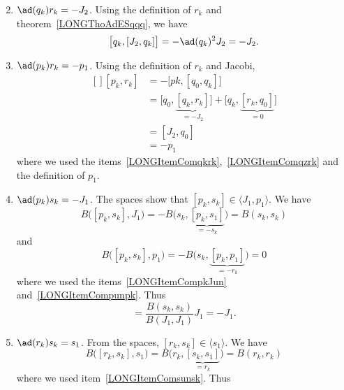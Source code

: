\begin{enumerate}
\begin{equation}
	      \end{equation}
	\item$\ad(q_k)r_k=-J_2$\label{LONGItemComqkrk}. Using the definition of $r_k$ and theorem~\ref{LONGThoAdESqqq}, we have
	      \begin{equation}
		      \big[ q_k,[J_2,q_k] \big]=-\ad(q_k)^2J_2=-J_2.
	      \end{equation}
	\item$\ad(p_k)r_k=-p_1$. Using the definition of $r_k$ and Jacobi,
	      \begin{equation}
		      \begin{aligned}[]
			      [p_k,r_k] & =-\big[ pk,[q_0,q_k] \big]                                                                  \\
			                & =\big[ q_0,\underbrace{[q_k,r_k]}_{=-J_2} \big]+\big[ q_k,\underbrace{[r_k,q_0]}_{=0} \big] \\
			                & =[J_2,q_0]                                                                                  \\
			                & =-p_1
		      \end{aligned}
	      \end{equation}
	      where we used the items~\ref{LONGItemComqkrk},~\ref{LONGItemComqzrk} and the definition of $p_1$.
	\item$\ad(p_k)s_k=-J_1$. The spaces show that $[p_k,s_k]\in\langle J_1,p_1\rangle$. We have
	      \begin{equation}
		      B\big( [p_k,s_k],J_1 \big)=-B\big( s_k,\underbrace{[p_k,s_1]}_{=-s_k} \big)=B(s_k,s_k)
	      \end{equation}
	      and
	      \begin{equation}
		      B\big( [p_k,s_k],p_1 \big)=-B\big( s_k,\underbrace{[p_k,p_1]}_{=-r_k} \big)=0
	      \end{equation}
	      where we used the items~\ref{LONGItemCompkJun} and~\ref{LONGItemCompunpk}. Thus
	      \begin{equation}
		      [p_k,s_k]=\frac{ B(s_k,s_k) }{ B(J_1,J_1) }J_1=-J_1.
	      \end{equation}
	\item$\ad(r_k)s_k=s_1$. From the spaces, $[r_k,s_k]\in\langle s_1\rangle$. We have
	      \begin{equation}
		      B\big( [r_k,s_k],s_1 \big)=B\big( r_k,\underbrace{[s_k,s_1]}_{=r_k} \big)=B(r_k,r_k)
	      \end{equation}
	      where we used item~\ref{LONGItemComsunsk}. Thus

\end{enumerate}
